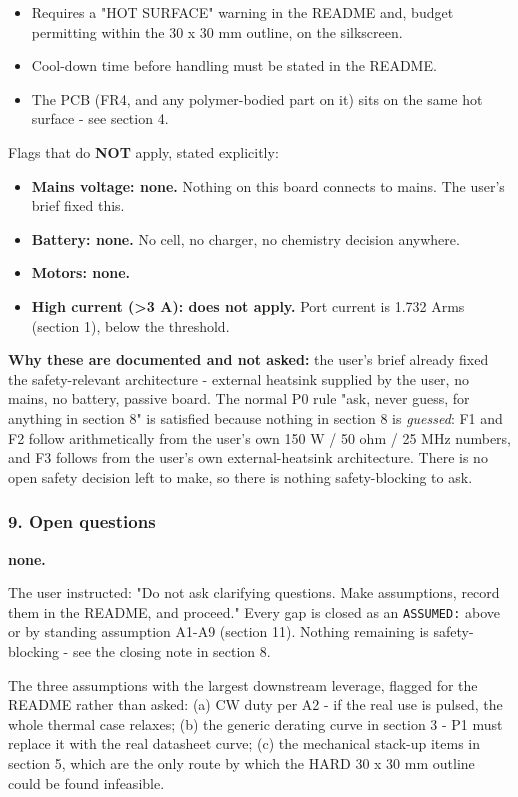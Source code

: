 \documentclass[11pt,a4paper]{article}
\begin{document}
\begin{itemize}
\item Requires a "HOT SURFACE" warning in the README and, budget permitting within the 30 x 30 mm
outline, on the silkscreen.
\item Cool-down time before handling must be stated in the README.
\item The PCB (FR4, and any polymer-bodied part on it) sits on the same hot surface - see section 4.
\end{itemize}
Flags that do \textbf{NOT} apply, stated explicitly:

\begin{itemize}
\item \textbf{Mains voltage: none.} Nothing on this board connects to mains. The user's brief fixed this.
\item \textbf{Battery: none.} No cell, no charger, no chemistry decision anywhere.
\item \textbf{Motors: none.}
\item \textbf{High current (\textgreater{}3 A): does not apply.} Port current is 1.732 Arms (section 1), below the
threshold.
\end{itemize}
\textbf{Why these are documented and not asked:} the user's brief already fixed the safety-relevant architecture - external heatsink supplied by the user, no mains, no battery, passive board. The normal P0 rule "ask, never guess, for anything in section 8" is satisfied because nothing in section 8 is \emph{guessed}: F1 and F2 follow arithmetically from the user's own 150 W / 50 ohm / 25 MHz numbers, and F3 follows from the user's own external-heatsink architecture. There is no open safety decision left to make, so there is nothing safety-blocking to ask.

\subsubsection*{9. Open questions}
\textbf{none.}

The user instructed: "Do not ask clarifying questions. Make assumptions, record them in the README, and proceed." Every gap is closed as an \texttt{ASSUMED:} above or by standing assumption A1-A9 (section 11). Nothing remaining is safety-blocking - see the closing note in section 8.

The three assumptions with the largest downstream leverage, flagged for the README rather than asked: (a) CW duty per A2 - if the real use is pulsed, the whole thermal case relaxes; (b) the generic derating curve in section 3 - P1 must replace it with the real datasheet curve; (c) the mechanical stack-up items in section 5, which are the only route by which the HARD 30 x 30 mm outline could be found infeasible.
\end{document}
